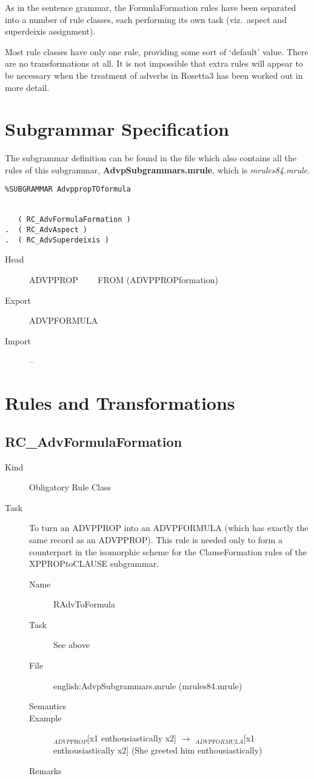 As in the sentence grammar, the FormulaFormation rules have been separated into 
a number of rule classes, each performing its own task (viz.\ aspect and 
superdeixis assignment). 

Most rule classes have only one rule, providing some sort of 
`default' value. There are no transformations at all. It is not impossible that 
extra rules will appear to be necessary when the treatment of adverbs in 
Rosetta3 has been worked out in more detail.


\section{Subgrammar Specification}
The subgrammar definition can be found in the file which also contains all the 
rules of this subgrammar, {\bf AdvpSubgrammars.mrule}, which is 
{\em mrules84.mrule\/}.

\begin{verbatim}
%SUBGRAMMAR AdvppropTOformula


   ( RC_AdvFormulaFormation )
.  ( RC_AdvAspect )
.  ( RC_AdvSuperdeixis )

\end{verbatim}

\begin{description}
  \item[Head]  ADVPPROP  \ \ \ \ FROM (ADVPPROPformation)
  \item[Export] ADVPFORMULA
  \item[Import] --
\end{description}

\newpage
\section{Rules and Transformations}

\subsection{RC\_AdvFormulaFormation}
\begin{description}
\item[Kind] Obligatory Rule Class
\item[Task] To turn an ADVPPROP into an ADVPFORMULA (which has exactly the same 
record as an ADVPPROP). This rule is needed only to form a counterpart in the 
isomorphic scheme for the ClauseFormation rules of the XPPROPtoCLAUSE 
subgrammar.

\vspace{1 cm}
\begin{description}
\item[Name] RAdvToFormula
\item[Task] See above
\item[File] english:AdvpSubgrammars.mrule (mrules84.mrule)
\item[Semantics]
\item[Example] $_{ADVPPROP}$[x1 enthousiastically x2] $\rightarrow$ 
$_{ADVPFORMULA}$[x1 enthousiastically x2] (She greeted him enthousiastically)
\item[Remarks] 
\end{description}

\end{description}

